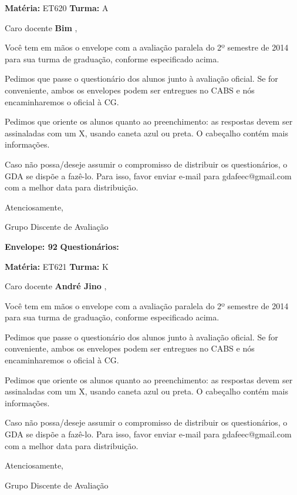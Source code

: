 \documentclass[a5paper]{letter}
\begin{document}
\newpage
\thispagestyle{empty}

\hfill {\bf Matéria:} ET620 {\bf Turma:} A

Caro docente {\bf Bim }, 

	Você tem em mãos o envelope com a avaliação paralela do 2º semestre de 2014 para sua turma de graduação, conforme especificado acima.

	Pedimos que passe o questionário dos alunos junto à avaliação oficial. Se for conveniente, ambos os envelopes podem ser entregues no CABS e nós encaminharemos o oficial à CG.

Pedimos que oriente os alunos quanto ao preenchimento: as respostas devem ser assinaladas com um X, usando caneta azul ou preta. O cabeçalho contém mais informações.

	Caso não possa/deseje assumir o compromisso de distribuir os questionários, o GDA se dispõe a fazê-lo. Para isso, favor enviar e-mail para gdafeec@gmail.com com a melhor data para distribuição.


Atenciosamente, 

Grupo Discente de Avaliação

\vspace{0.5cm}

{\bf Envelope: 92 }		\hfill	{\bf Questionários:} \hspace{2cm}

\newpage
\thispagestyle{empty}

\hfill {\bf Matéria:} ET621 {\bf Turma:} K

Caro docente {\bf André Jino }, 

	Você tem em mãos o envelope com a avaliação paralela do 2º semestre de 2014 para sua turma de graduação, conforme especificado acima.

	Pedimos que passe o questionário dos alunos junto à avaliação oficial. Se for conveniente, ambos os envelopes podem ser entregues no CABS e nós encaminharemos o oficial à CG.

Pedimos que oriente os alunos quanto ao preenchimento: as respostas devem ser assinaladas com um X, usando caneta azul ou preta. O cabeçalho contém mais informações.

	Caso não possa/deseje assumir o compromisso de distribuir os questionários, o GDA se dispõe a fazê-lo. Para isso, favor enviar e-mail para gdafeec@gmail.com com a melhor data para distribuição.


Atenciosamente, 

Grupo Discente de Avaliação
\end{document}
